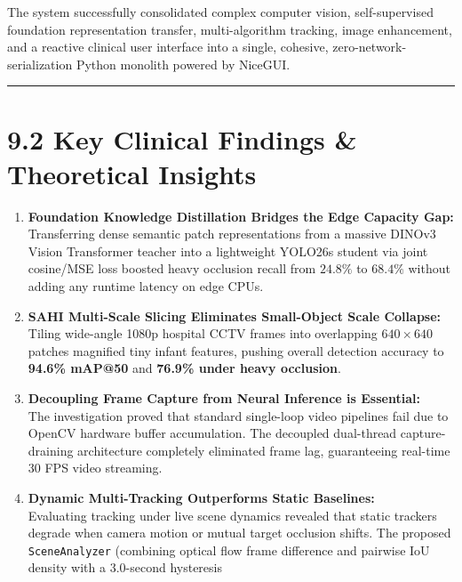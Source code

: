 The system successfully consolidated complex computer vision,
self-supervised foundation representation transfer, multi-algorithm
tracking, image enhancement, and a reactive clinical user interface into
a single, cohesive, zero-network-serialization Python monolith powered
by NiceGUI.

\begin{center}\rule{0.5\linewidth}{0.5pt}\end{center}

\section{9.2 Key Clinical Findings \& Theoretical
Insights}\label{key-clinical-findings-theoretical-insights}

\begin{enumerate}
\def\labelenumi{\arabic{enumi}.}
\tightlist
\item
  \textbf{Foundation Knowledge Distillation Bridges the Edge Capacity
  Gap:}\\
  Transferring dense semantic patch representations from a massive
  DINOv3 Vision Transformer teacher into a lightweight YOLO26s student
  via joint cosine/MSE loss boosted heavy occlusion recall from
  \(24.8\%\) to \(68.4\%\) without adding any runtime latency on edge
  CPUs.
\item
  \textbf{SAHI Multi-Scale Slicing Eliminates Small-Object Scale
  Collapse:}\\
  Tiling wide-angle 1080p hospital CCTV frames into overlapping
  \(640\times 640\) patches magnified tiny infant features, pushing
  overall detection accuracy to \textbf{94.6\% mAP@50} and
  \textbf{76.9\% under heavy occlusion}.
\item
  \textbf{Decoupling Frame Capture from Neural Inference is
  Essential:}\\
  The investigation proved that standard single-loop video pipelines
  fail due to OpenCV hardware buffer accumulation. The decoupled
  dual-thread capture-draining architecture completely eliminated frame
  lag, guaranteeing real-time 30 FPS video streaming.
\item
  \textbf{Dynamic Multi-Tracking Outperforms Static Baselines:}\\
  Evaluating tracking under live scene dynamics revealed that static
  trackers degrade when camera motion or mutual target occlusion shifts.
  The proposed \texttt{SceneAnalyzer} (combining optical flow frame
  difference and pairwise IoU density with a 3.0-second hysteresis

\end{enumerate}
